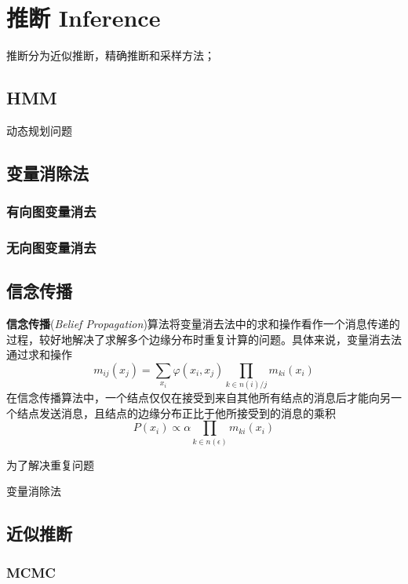 \chapter{推断 Inference}


推断分为近似推断，精确推断和采样方法；

\section{HMM}

动态规划问题

\section{变量消除法}

\subsection*{有向图变量消去}



\subsection*{无向图变量消去}

\section{信念传播}

\textbf{信念传播}(\textsl{Belief Propagation})算法将变量消去法中的求和操作看作一个消息传递的过程，较好地解决了求解多个边缘分布时重复计算的问题。具体来说，变量消去法通过求和操作
\begin{equation}
    m_{ij}(x_j)=\sum_{x_i}\varphi(x_i,x_j)\prod_{k\in n(i)/j}m_{ki}(x_i)
\end{equation}
在信念传播算法中，一个结点仅仅在接受到来自其他所有结点的消息后才能向另一个结点发送消息，且结点的边缘分布正比于他所接受到的消息的乘积
\begin{equation}
    P(x_i)\propto \alpha\prod_{k\in n(\epsilon)}m_{ki}(x_i)
\end{equation}

为了解决重复问题

变量消除法

\section{近似推断}

\subsection*{MCMC}

